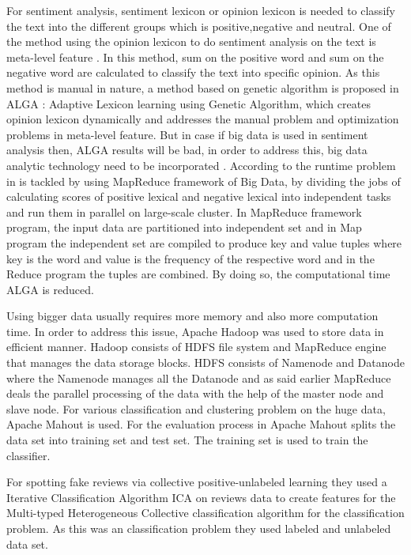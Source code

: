 \documentclass[sigconf]{acmart}
\begin{document}
For sentiment analysis, sentiment lexicon or opinion lexicon is needed to classify the text into the different groups which is positive,negative and neutral. One of the method using the opinion lexicon to do sentiment analysis on the text is meta-level feature \cite{BRAVOMARQUEZ201486}. In this method, sum on the positive word and sum on the negative word are calculated to classify the text into specific opinion. As this method is manual in nature, a method based on genetic algorithm is proposed in \cite{KESHAVARZ20171} ALGA : Adaptive Lexicon learning using Genetic Algorithm, which creates opinion lexicon dynamically and addresses the manual problem and optimization problems in meta-level feature. But in case if big data is used in sentiment analysis then, ALGA results will be bad, in order to address this, big data analytic technology need to be incorporated \cite{bigdatainsenti}. According to \cite{bigdatainsenti} the runtime problem in \cite{KESHAVARZ20171} is tackled by using MapReduce framework of Big Data, by dividing the jobs of calculating scores of positive lexical and negative lexical into independent tasks and run them in parallel on large-scale cluster. In MapReduce framework program, the input data are partitioned into independent set and in Map program the independent set are compiled to produce key and value tuples where key is the word and value is the frequency of the respective word and in the Reduce program the tuples are combined. By doing so, the computational time ALGA \cite{KESHAVARZ20171} is reduced. 

Using bigger data usually requires more memory and also more computation time. In order to address this issue, Apache Hadoop \cite{hadoopsenti} was used to store data in efficient manner. Hadoop consists of HDFS file system and MapReduce engine that manages the data storage blocks. HDFS consists of Namenode and Datanode \cite{hadoopsenti} where the Namenode manages all the Datanode and as said earlier MapReduce deals the parallel processing of the data with the help of the master node and slave node. For various classification and clustering problem on the huge data, Apache Mahout \cite{hadoopsenti} is used. For the evaluation process in \cite{hadoopsenti} Apache Mahout splits the data set into training set and test set. The training set is used to train the classifier.

For spotting fake reviews via collective positive-unlabeled learning \cite{7023420} they used a Iterative Classification Algorithm ICA \cite{7023420} on reviews data to create features for the Multi-typed Heterogeneous Collective classification algorithm for the classification problem. As this was an classification problem they used labeled and unlabeled data set.
\end{document}
